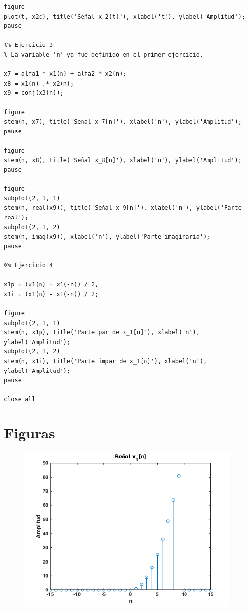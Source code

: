 \documentclass{article}
\begin{document}
\begin{lstlisting}
figure
plot(t, x2c), title('Señal x_2(t)'), xlabel('t'), ylabel('Amplitud');
pause

%% Ejercicio 3
% La variable 'n' ya fue definido en el primer ejercicio.

x7 = alfa1 * x1(n) + alfa2 * x2(n);
x8 = x1(n) .* x2(n);
x9 = conj(x3(n));

figure
stem(n, x7), title('Señal x_7[n]'), xlabel('n'), ylabel('Amplitud');
pause

figure
stem(n, x8), title('Señal x_8[n]'), xlabel('n'), ylabel('Amplitud');
pause

figure
subplot(2, 1, 1)
stem(n, real(x9)), title('Señal x_9[n]'), xlabel('n'), ylabel('Parte real');
subplot(2, 1, 2)
stem(n, imag(x9)), xlabel('n'), ylabel('Parte imaginaria');
pause

%% Ejercicio 4

x1p = (x1(n) + x1(-n)) / 2;
x1i = (x1(n) - x1(-n)) / 2;

figure
subplot(2, 1, 1)
stem(n, x1p), title('Parte par de x_1[n]'), xlabel('n'), ylabel('Amplitud');
subplot(2, 1, 2)
stem(n, x1i), title('Parte impar de x_1[n]'), xlabel('n'), ylabel('Amplitud');
pause

close all
\end{lstlisting}

\newpage
\pagestyle{plain} 
\section{Figuras}

\begin{figure}[h] \caption[Figura 1]{}
	\centering
		\includegraphics[width=\linewidth]{./Figures/01.png}
\end{figure}
\end{document}
